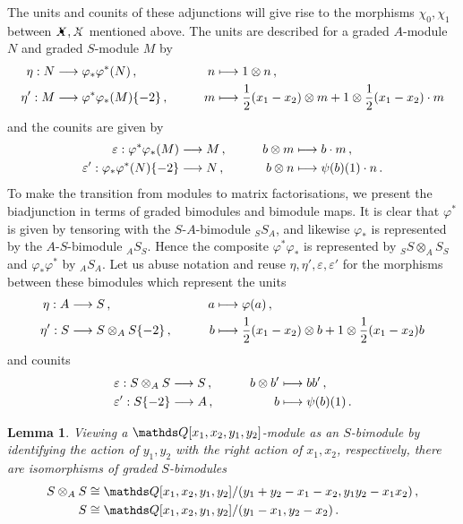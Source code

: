 \documentclass{compositio}
\newtheorem{lemma}[theorem]{Lemma}
\theoremstyle{definition}
\numberwithin{equation}{section}
\begin{document}
The units and counits of these adjunctions will give rise to the morphisms $\chi_0, \chi_1$ between $\Xbul, \Xcirc$ mentioned above. The units are described for a graded $A$-module $N$ and graded $S$-module $M$ by
\begin{align*}
\eta: N & \longrightarrow \varphi_* \varphi^*(N) \, , \qquad & n & \longmapsto 1 \otimes n \, ,\\
\eta': M & \longrightarrow \varphi^* \varphi_*(M)\{-2\} \, , \qquad & m & \longmapsto \frac{1}{2}(x_1-x_2) \otimes m + 1 \otimes \frac{1}{2}(x_1 - x_2) \cdot m
\end{align*}
and the counits are given by
\begin{align*}
\varepsilon: \varphi^* \varphi_*(M) & \longrightarrow M \, , \qquad & b \otimes m & \longmapsto b \cdot m \, ,\\
\varepsilon': \varphi_*\varphi^*(N)\{-2\} & \longrightarrow N \, , \qquad & b \otimes n & \longmapsto \psi(b)(1) \cdot n \, .
\end{align*}
To make the transition from modules to matrix factorisations, we present the biadjunction in terms of graded bimodules and bimodule maps. It is clear that $\varphi^*$ is given by tensoring with the $S$-$A$-bimodule ${}_S S_A$, and likewise $\varphi_*$ is represented by the $A$-$S$-bimodule ${}_A S_S$. Hence the composite $\varphi^* \varphi_*$ is represented by ${}_S S \otimes_A S {}_S$ and $\varphi_* \varphi^*$ by ${}_A S {}_A$. Let us abuse notation and reuse $\eta, \eta', \varepsilon, \varepsilon'$ for the morphisms between these bimodules which represent the units
\begin{align*}
\eta: A & \longrightarrow S \, , \qquad & a & \longmapsto \varphi(a)\,,\\
\eta': S & \longrightarrow S \otimes_A S\{-2\} \, , \qquad & b &\longmapsto \frac{1}{2}(x_1 - x_2) \otimes b + 1 \otimes \frac{1}{2}(x_1 - x_2)b
\end{align*}
and counits
\begin{align*}
& \varepsilon: S \otimes_A S \longrightarrow S \, , \qquad & b \otimes b' & \longmapsto bb'\,,\\
& \varepsilon': S\{-2\} \longrightarrow A \, , \qquad & b & \longmapsto \psi(b)(1) \, . 
\end{align*}

\begin{lemma}\label{lemma:bimodules_as_algebras} Viewing a $\QQ[x_1,x_2,y_1,y_2]$-module as an $S$-bimodule by identifying the action of $y_1, y_2$ with the right action of $x_1, x_2$, respectively, there are isomorphisms of graded $S$-bimodules
\begin{align*}
S \otimes_A S & \cong \QQ[x_1,x_2,y_1,y_2]/(y_1 + y_2 - x_1 - x_2, y_1 y_2 - x_1 x_2) \, ,\\
S & \cong \QQ[x_1,x_2,y_1,y_2]/(y_1 - x_1, y_2 - x_2)\,.
\end{align*}
\end{lemma}
\end{document}
